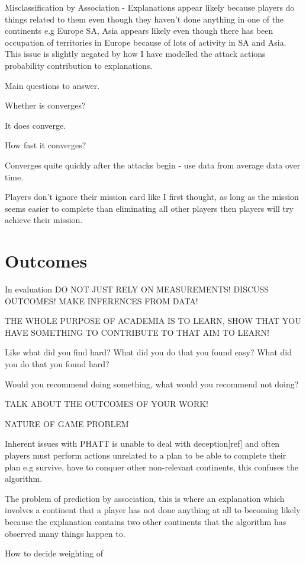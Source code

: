 \documentclass[parskip]{cs4rep}
\begin{document}
Misclassification by Association - Explanations appear likely because players do things related to them even though they haven't done anything in one of the continents e.g Europe SA, Asia appears likely even though there has been occupation of territories in Europe because of lots of activity in SA and Asia. This issue is slightly negated by how I have modelled the attack actions probability contribution to explanations.

Main questions to answer.

Whether is converges?

It does converge.

How fast it converges?

Converges quite quickly after the attacks begin - use data from average data over time.

Players don't ignore their mission card like I first thought, as long as the mission seems easier to complete than eliminating all other players then players will try achieve their mission.

\section{Outcomes}

In evaluation DO NOT JUST RELY ON MEASUREMENTS! DISCUSS OUTCOMES! MAKE INFERENCES FROM DATA!

THE WHOLE PURPOSE OF ACADEMIA IS TO LEARN, SHOW THAT YOU HAVE SOMETHING TO CONTRIBUTE TO THAT AIM TO LEARN!

Like what did you find hard? What did you do that you found easy? What did you do that you found hard? 

Would you recommend doing something, what would you recommend not doing?

TALK ABOUT THE OUTCOMES OF YOUR WORK!

NATURE OF GAME PROBLEM

Inherent issues with PHATT is unable to deal with deception[ref] and often players must perform actions unrelated to a plan to be able to complete their plan e.g survive, have to conquer other non-relevant continents, this confuses the algorithm.

The problem of prediction by association, this is where an explanation which involves a continent that a player has not done anything at all to becoming likely because the explanation contains two other continents that the algorithm has observed many things happen to.

How to decide weighting of 
\end{document}
